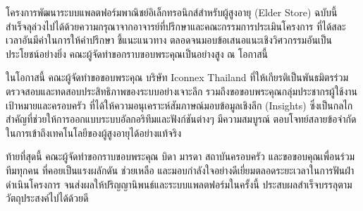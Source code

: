 \begin{acknowledgments}
โครงการพัฒนาระบบแพลตฟอร์มพาณิชย์อิเล็กทรอนิกส์สำหรับผู้สูงอายุ (Elder Store) ฉบับนี้ สำเร็จลุล่วงไปได้ด้วยความกรุณาจากอาจารย์ที่ปรึกษาและคณะกรรมการประเมินโครงการ ที่ได้สละเวลาอันมีค่าในการให้คำปรึกษา ชี้แนะแนวทาง ตลอดจนมอบข้อเสนอแนะเชิงวิศวกรรมอันเป็นประโยชน์อย่างยิ่ง คณะผู้จัดทำขอกราบขอบพระคุณเป็นอย่างสูง ณ โอกาสนี้

ในโอกาสนี้ คณะผู้จัดทำขอขอบพระคุณ บริษัท Iconnex Thailand ที่ให้เกียรติเป็นพันธมิตรร่วมตรวจสอบและทดสอบประสิทธิภาพของระบบอย่างเจาะลึก รวมถึงขอขอบพระคุณกลุ่มประชากรผู้ใช้งานเป้าหมายและครอบครัว ที่ได้ให้ความอนุเคราะห์สัมภาษณ์มอบข้อมูลเชิงลึก (Insights) ซึ่งเป็นกลไกสำคัญที่ช่วยให้การออกแบบระบบอัลกอริทึมและฟังก์ชันต่างๆ มีความสมบูรณ์ ตอบโจทย์สลายข้อจำกัดในการเข้าถึงเทคโนโลยีของผู้สูงอายุได้อย่างแท้จริง

ท้ายที่สุดนี้ คณะผู้จัดทำขอกราบขอบพระคุณ บิดา มารดา สถาบันครอบครัว และขอขอบคุณเพื่อนร่วมทีมทุกคน ที่คอยเป็นแรงผลักดัน ช่วยเหลือ และมอบกำลังใจอย่างดีเยี่ยมตลอดระยะเวลาในการฟันฝ่าดำเนินโครงการ จนส่งผลให้ปริญญานิพนธ์และระบบแพลตฟอร์มในครั้งนี้ ประสบผลสำเร็จบรรลุตามวัตถุประสงค์ไปได้ด้วยดี
\end{acknowledgments}
\fi %

\contentspage

\ifproject
\figurelistpage

\tablelistpage
\fi %
